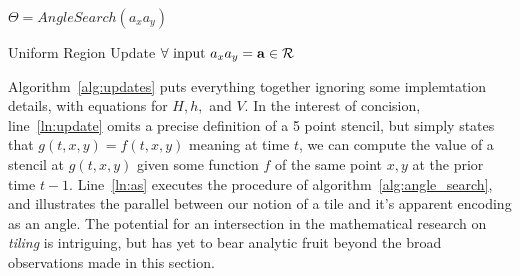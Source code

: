 
\begin{algorithm}[h]
  \setcounter{AlgoLine}{0}
  $\Theta = AngleSearch(a_xa_y)$\; \label{ln:as}

  \caption{Uniform Region Update $\forall \text{ input } a_xa_y = \mathbf{a} \in \mathcal{R}$}
  \label{alg:updates}
\end{algorithm}

Algorithm~\ref{alg:updates} puts everything together ignoring some implemtation details,
with equations for $H,h,$ and $V$.
In the interest of concision, line~\ref{ln:update} omits a precise definition of a 5
point stencil, but simply states that $g(t,x,y) = f(t,x,y)$ meaning at time
$t$, we can compute the value of a stencil at $g(t,x,y)$ given some function $f$
of the same point $x,y$ at the prior time $t-1$.
Line~\ref{ln:as} executes the procedure of algorithm~\ref{alg:angle_search},
and illustrates the parallel between our notion of a tile and
it's apparent encoding as an angle.  The potential for
an intersection in the mathematical research on {\it tiling} is
intriguing, but has yet to bear analytic fruit beyond the broad
observations made in this section.


